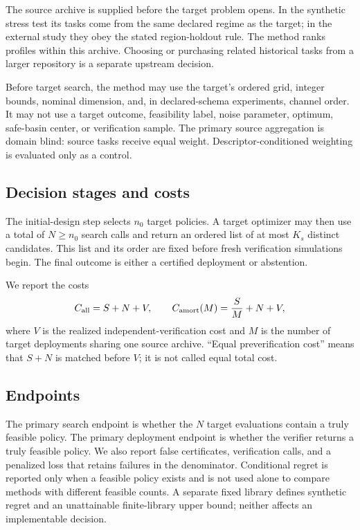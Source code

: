 The source archive is supplied before the target problem opens.  In the
synthetic stress test its tasks come from the same declared regime as the
target; in the external study they obey the stated region-holdout rule.  The
method ranks profiles within this archive.  Choosing or purchasing related
historical tasks from a larger repository is a separate upstream decision.

Before target search, the method may use the target's ordered grid, integer
bounds, nominal dimension, and, in declared-schema experiments, channel order.
It may not use a target outcome, feasibility label, noise parameter, optimum,
safe-basin center, or verification sample.  The primary source aggregation is
domain blind: source tasks receive equal weight.  Descriptor-conditioned
weighting is evaluated only as a control.

\subsection{Decision stages and costs}

The initial-design step selects $n_0$ target policies.  A target optimizer may
then use a total of $N\ge n_0$ search calls and return an ordered list of at
most $K_s$ distinct candidates.  This list and its order are fixed before
fresh verification simulations begin.  The final outcome is either a
certified deployment or abstention.

We report the costs
\begin{equation}\label{eq:cost-identity}
  C_{\rm all}=S+N+V,
  \qquad
  C_{\rm amort}(M)=\frac{S}{M}+N+V,
\end{equation}
where $V$ is the realized independent-verification cost and $M$ is the number
of target deployments sharing one source archive.  ``Equal preverification
cost'' means that $S+N$ is matched before $V$; it is not called equal total
cost.

\subsection{Endpoints}

The primary search endpoint is whether the $N$ target evaluations contain a
truly feasible policy.  The primary deployment endpoint is whether the
verifier returns a truly feasible policy.  We also report false certificates,
verification calls, and a penalized loss that retains failures in the
denominator.  Conditional regret is reported only when a feasible policy
exists and is not used alone to compare methods with different feasible
counts.  A separate fixed library defines synthetic regret and an unattainable
finite-library upper bound; neither affects an implementable decision.
